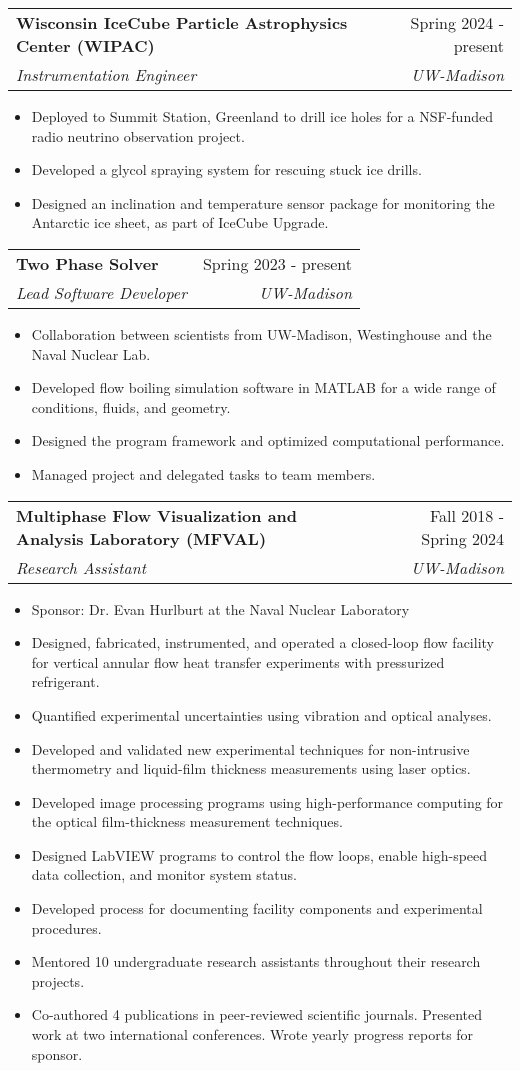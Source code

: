 \documentclass[letterpaper,11pt]{article}
\makeatletter
\newcommand{\resumeItem}[1]{
  \item\small{
    {#1 \vspace{-2pt}}
  }
}
\newcommand{\resumeSubheading}[4]{
  \vspace{-1pt}\item
    \begin{tabular*}{0.97\textwidth}[t]{l@{\extracolsep{\fill}}r}
      \textbf{#1} & #2 \\
      \textit{\small#3} & \textit{\small #4} \\
    \end{tabular*}\vspace{-7pt}
}
\newcommand{\resumeItemListStart}{\begin{itemize}[rightmargin=1.650in]\itemsep0.1em \small}
\newcommand{\resumeItemListEnd}{\end{itemize}\vspace{-5pt}}
\makeatother
\begin{document}
    \resumeSubheading
    {Wisconsin IceCube Particle Astrophysics Center (WIPAC) }{Spring 2024 - present}
      {Instrumentation Engineer}{UW-Madison}
      \resumeItemListStart
        \resumeItem{Deployed to Summit Station, Greenland to drill ice holes for a NSF-funded radio neutrino observation project.}
        \resumeItem{Developed a glycol spraying system for rescuing stuck ice drills.}
        \resumeItem{Designed an inclination and temperature sensor package for monitoring the Antarctic ice sheet, as part of IceCube Upgrade.}
      \resumeItemListEnd

    \resumeSubheading
    {Two Phase Solver}{Spring 2023 - present}
    {Lead Software Developer}{UW-Madison}
      \resumeItemListStart
      \resumeItem{Collaboration between scientists from UW-Madison, Westinghouse and the Naval Nuclear Lab.}
      \resumeItem{Developed flow boiling simulation software in MATLAB for a wide range of conditions, fluids, and geometry.}
      \resumeItem{Designed the program framework and optimized computational performance.}
      \resumeItem{Managed project and delegated tasks to team members.}
      \resumeItemListEnd

    \resumeSubheading
    {Multiphase Flow Visualization and Analysis Laboratory (MFVAL) }{Fall 2018 - Spring 2024}
      {Research Assistant}{UW-Madison}
      \resumeItemListStart
        \item[]\small{Sponsor: Dr. Evan Hurlburt at the Naval Nuclear Laboratory \vspace{-2pt}}
        \resumeItem{Designed, fabricated, instrumented, and operated a closed-loop flow facility for vertical annular flow heat transfer experiments with pressurized refrigerant.}
        \resumeItem{Quantified experimental uncertainties using vibration and optical analyses.}
        \resumeItem{Developed and validated new experimental techniques for non-intrusive thermometry and liquid-film thickness measurements using laser optics.}
        \resumeItem{Developed image processing programs using high-performance computing for the optical film-thickness measurement techniques.}
        \resumeItem{Designed LabVIEW programs to control the flow loops, enable high-speed data collection, and monitor system status.}
        \resumeItem{Developed process for documenting facility components and experimental procedures.}
        \resumeItem{Mentored 10 undergraduate research assistants throughout their research projects.}
        \resumeItem{Co-authored 4 publications in peer-reviewed scientific journals. Presented work at two international conferences. Wrote yearly progress reports for sponsor.}
      \resumeItemListEnd
    
\end{document}
